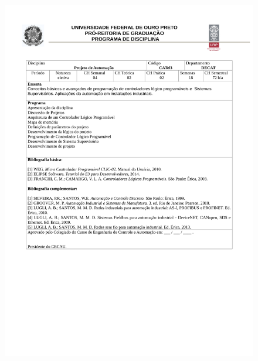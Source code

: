 \begin{figure}[p]
	\centering 
	\includegraphics[scale=0.7]{capitulos/anexo1-programas-disciplina/eg23.pdf}
\end{figure}

